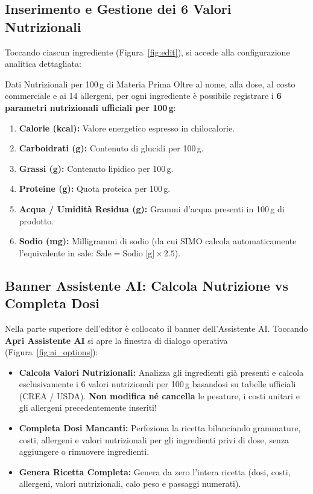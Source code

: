\documentclass[11pt,a4paper]{article}
\begin{document}
\subsection{Inserimento e Gestione dei 6 Valori Nutrizionali}
Toccando ciascun ingrediente (Figura~\ref{fig:edit}), si accede alla configurazione analitica dettagliata:
\begin{simobox}{Dati Nutrizionali per 100\,g di Materia Prima}
Oltre al nome, alla dose, al costo commerciale e ai 14 allergeni, per ogni ingrediente \`e possibile registrare i \textbf{6 parametri nutrizionali ufficiali per 100\,g}:
\begin{enumerate}[leftmargin=*,noitemsep]
    \item \textbf{Calorie (kcal):} Valore energetico espresso in chilocalorie.
    \item \textbf{Carboidrati (g):} Contenuto di glucidi per 100\,g.
    \item \textbf{Grassi (g):} Contenuto lipidico per 100\,g.
    \item \textbf{Proteine (g):} Quota proteica per 100\,g.
    \item \textbf{Acqua / Umidit\`a Residua (g):} Grammi d'acqua presenti in 100\,g di prodotto.
    \item \textbf{Sodio (mg):} Milligrammi di sodio (da cui SIMO calcola automaticamente l'equivalente in sale: $\text{Sale} = \text{Sodio [g]} \times 2.5$).
\end{enumerate}
\end{simobox}

\subsection{Banner Assistente AI: Calcola Nutrizione vs Completa Dosi}
Nella parte superiore dell'editor \`e collocato il banner dell'Assistente AI. Toccando \textbf{Apri Assistente AI} si apre la finestra di dialogo operativa (Figura~\ref{fig:ai_options}):
\begin{itemize}[leftmargin=*]
    \item \textbf{Calcola Valori Nutrizionali:} Analizza gli ingredienti gi\`a presenti e calcola esclusivamente i 6 valori nutrizionali per 100\,g basandosi su tabelle ufficiali (CREA / USDA). \textbf{Non modifica n\'e cancella} le pesature, i costi unitari e gli allergeni precedentemente inseriti!
    \item \textbf{Completa Dosi Mancanti:} Perfeziona la ricetta bilanciando grammature, costi, allergeni e valori nutrizionali per gli ingredienti privi di dose, senza aggiungere o rimuovere ingredienti.
    \item \textbf{Genera Ricetta Completa:} Genera da zero l'intera ricetta (dosi, costi, allergeni, valori nutrizionali, calo peso e passaggi numerati).
\end{itemize}
\end{document}
